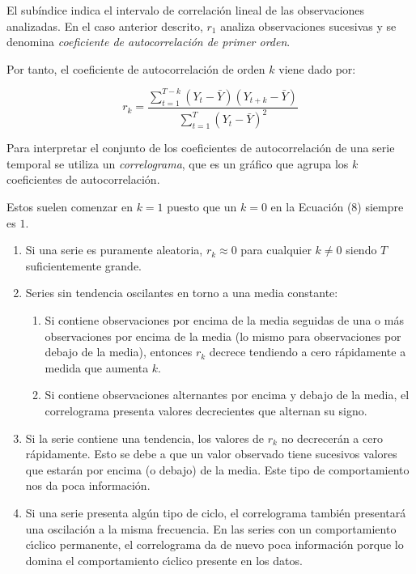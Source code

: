 \documentclass[a4paper,10pt]{article}
\begin{document}
El subíndice indica el intervalo de correlación lineal de las observaciones analizadas. En el caso anterior descrito, $r_1$ analiza observaciones sucesivas y se denomina \textit{coeficiente de autocorrelación de primer orden}.

Por tanto, el coeficiente de autocorrelación de orden $k$ viene dado por:

\begin{equation}
 r_k = \frac{\sum_{t=1}^{T-k} (Y_t - \bar{Y}) (Y_{t+k} - \bar{Y})}
 {\sum_{t=1}^{T} (Y_t - \bar{Y})^2 }
\end{equation}

Para interpretar el conjunto de los coeficientes de autocorrelación de una serie temporal se utiliza un \textit{correlograma}, que es un gráfico que agrupa los $k$ coeficientes de autocorrelación.

Estos suelen comenzar en $k=1$ puesto que un $k=0$ en la Ecuación (8) siempre es $1$.

\begin{enumerate}
 \item Si una serie es puramente aleatoria, $r_k \approx 0$ para cualquier $k \neq 0$ siendo $T$ suficientemente grande.

 \item Series sin tendencia oscilantes en torno a una media constante:

 \begin{enumerate}
  \item Si contiene observaciones por encima de la media seguidas de una o más observaciones por encima de la media (lo mismo para observaciones por debajo de la media), entonces $r_k$ decrece tendiendo a cero rápidamente a medida que aumenta $k$.

  \item Si contiene observaciones alternantes por encima y debajo de la media, el correlograma presenta valores decrecientes que alternan su signo.
 \end{enumerate}

  \item Si la serie contiene una tendencia, los valores de $r_k$ no decrecerán a cero rápidamente. Esto se debe a que un valor observado tiene sucesivos valores que estarán por encima (o debajo) de la media. Este tipo de comportamiento nos da poca información.

  \item Si una serie presenta algún tipo de ciclo, el correlograma también presentará una oscilación a la misma frecuencia. En las series con un comportamiento cı́clico permanente, el correlograma da de nuevo poca información porque lo domina el comportamiento cı́clico presente en los datos.
\end{enumerate}
\end{document}
